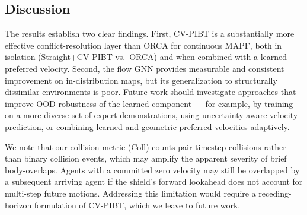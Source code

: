 \subsection{Discussion}

The results establish two clear findings. First, CV-PIBT is a substantially more effective conflict-resolution layer than ORCA for continuous MAPF, both in isolation (Straight+CV-PIBT vs.\ ORCA) and when combined with a learned preferred velocity. Second, the flow GNN provides measurable and consistent improvement on in-distribution maps, but its generalization to structurally dissimilar environments is poor. Future work should investigate approaches that improve OOD robustness of the learned component --- for example, by training on a more diverse set of expert demonstrations, using uncertainty-aware velocity prediction, or combining learned and geometric preferred velocities adaptively.

We note that our collision metric (Coll) counts pair-timestep collisions rather than binary collision events, which may amplify the apparent severity of brief body-overlaps. Agents with a committed zero velocity may still be overlapped by a subsequent arriving agent if the shield's forward lookahead does not account for multi-step future motions. Addressing this limitation would require a receding-horizon formulation of CV-PIBT, which we leave to future work.
